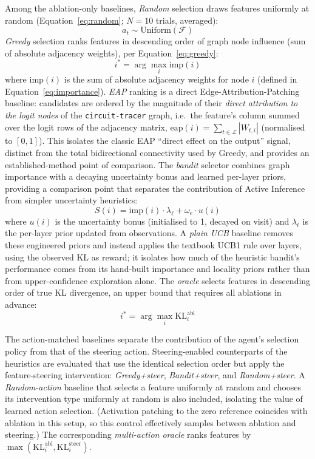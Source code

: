 Among the ablation-only baselines, \emph{Random} selection draws features uniformly at random
(Equation~\ref{eq:random}; $N=10$ trials, averaged):
\begin{equation}
  \label{eq:random}
  a_t \sim \text{Uniform}(\mathcal{F})
\end{equation}
\emph{Greedy} selection ranks features in descending order of graph
node influence (sum of absolute adjacency weights), per
Equation~\ref{eq:greedy}:
\begin{equation}
  \label{eq:greedy}
  i^* = \arg\max_i \text{imp}(i)
\end{equation}
where $\text{imp}(i)$ is the sum of absolute adjacency weights for node
$i$ (defined in Equation~\ref{eq:importance}).
\emph{EAP} ranking is a direct Edge-Attribution-Patching baseline: candidates are
ordered by the magnitude of their \emph{direct attribution to the logit nodes} of
the \texttt{circuit-tracer} graph, i.e.\ the feature's column summed over the logit
rows of the adjacency matrix, $\mathrm{eap}(i)=\sum_{t\in\mathcal{L}}|W_{t,i}|$
(normalised to $[0,1]$). This isolates the classic EAP ``direct effect on the
output'' signal, distinct from the total bidirectional connectivity used by Greedy,
and provides an established-method point of comparison.
The \emph{bandit}
selector combines graph importance with a decaying uncertainty bonus
and learned per-layer priors, providing a comparison point that
separates the contribution of Active Inference from simpler
uncertainty heuristics:
\begin{equation}
  \label{eq:bandit}
  S(i) = \text{imp}(i)\cdot\lambda_\ell + \omega_e \cdot u(i)
\end{equation}
where $u(i)$ is the uncertainty bonus (initialised to 1, decayed on
visit) and $\lambda_\ell$ is the per-layer prior updated from
observations. A \emph{plain UCB} baseline removes these engineered
priors and instead applies the textbook UCB1 rule over layers, using the
observed KL as reward; it isolates how much of the heuristic bandit's
performance comes from its hand-built importance and locality priors
rather than from upper-confidence exploration alone.
The \emph{oracle} selects features in descending order
of true KL divergence, an upper bound that requires all ablations in
advance:
\begin{equation}
  \label{eq:oracle}
  i^* = \arg\max_i \text{KL}_i^{\text{abl}}
\end{equation}

The action-matched baselines separate the contribution of the agent's selection
policy from that of the steering action. Steering-enabled counterparts of the
heuristics are evaluated that use the identical selection order but apply the
feature-steering intervention: \emph{Greedy+steer}, \emph{Bandit+steer}, and
\emph{Random+steer}. A \emph{Random-action} baseline that selects a feature uniformly
at random and chooses its intervention type uniformly at random is also included,
isolating the value of learned action selection. (Activation patching to the zero reference
coincides with ablation in this setup, so this control effectively samples between
ablation and steering.) The
corresponding \emph{multi-action oracle} ranks features by
$\max(\text{KL}^{\text{abl}}_i,\text{KL}^{\text{steer}}_i)$.


